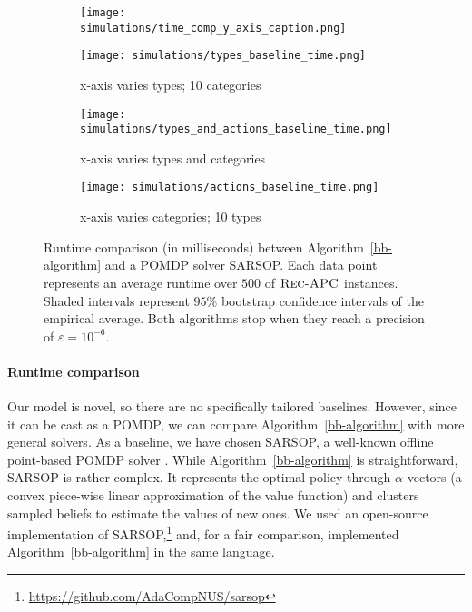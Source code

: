 \begin{figure*}
\centering
\begin{subfigure}{0.02\textwidth}
   \centering
   \texttt{[image: simulations/time\_comp\_y\_axis\_caption.png]}
   \vspace{0.7cm} %
\end{subfigure}%
\hspace{0.1cm} %
\begin{subfigure}{0.3\textwidth}
   \centering
   \texttt{[image: simulations/types\_baseline\_time.png]}
   \caption{x-axis varies types; 10 categories}
   \label{fig:types_time}
   \vspace{0.5cm} %
\end{subfigure}%
\hspace{0.2cm} %
\begin{subfigure}{0.307\textwidth}
   \centering
   \texttt{[image: simulations/types\_and\_actions\_baseline\_time.png]}
   \caption{x-axis varies types and categories}
   \label{fig:actions_types_time}
   \vspace{0.5cm} %
\end{subfigure}%
\hspace{0.2cm} %
\begin{subfigure}{0.3\textwidth}
   \centering
   \texttt{[image: simulations/actions\_baseline\_time.png]}
   \caption{x-axis varies categories; 10 types}
   \label{fig:actions_time}
   \vspace{0.5cm} %
\end{subfigure}%
\caption{Runtime comparison (in milliseconds) between Algorithm~\ref{bb-algorithm} and a POMDP solver SARSOP. Each data point represents an average runtime over $500$ of $\textsc{Rec-APC}$ instances. Shaded intervals represent $95\%$ bootstrap confidence intervals of the empirical average. Both algorithms stop when they reach a precision of $\varepsilon=10^{-6}$.\label{fig:sarsop}}
\end{figure*}


\paragraph{Runtime comparison}
Our model is novel, so there are no specifically tailored baselines. However, since it can be cast as a POMDP, we can compare Algorithm~\ref{bb-algorithm} with more general solvers. As a baseline, we have chosen SARSOP, a well-known offline point-based POMDP solver \cite{kurniawati2009sarsop}. While Algorithm~\ref{bb-algorithm} is straightforward, 
SARSOP is rather complex. It represents the optimal policy through $\alpha$-vectors (a convex piece-wise linear approximation of the value function) and clusters sampled beliefs to estimate the values of new ones. We used an open-source implementation of SARSOP,\footnote{\url{https://github.com/AdaCompNUS/sarsop}} and, for a fair comparison, implemented Algorithm~\ref{bb-algorithm} in the same language. 

